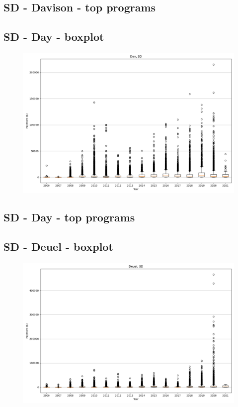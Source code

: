 \subsection*{SD - Davison - top programs}

\newpage
\subsection*{SD - Day - boxplot}
\begin{figure}[h]
\centering
\includegraphics[width=7in]{../output/boxplots/counties/Day-SD_boxplot.png}
\end{figure}


\subsection*{SD - Day - top programs}

\newpage
\subsection*{SD - Deuel - boxplot}
\begin{figure}[h]
\centering
\includegraphics[width=7in]{../output/boxplots/counties/Deuel-SD_boxplot.png}
\end{figure}


